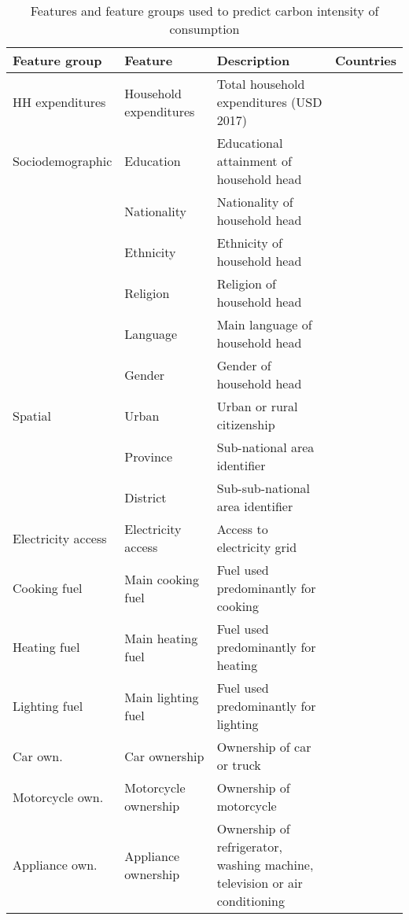 \begin{table}[ht!]
  \centering
\begin{adjustbox}{width=1\textwidth}
\begin{tabular}[]{l|l|l|r}
\toprule
\multicolumn{1}{l}{Feature group} & \multicolumn{1}{l}{Feature} & \multicolumn{1}{l}{Description} & \multicolumn{1}{l}{Countries} \\ \hline
     
        HH expenditures & Household expenditures & Total household expenditures (USD 2017) & \\ \hline
        Sociodemographic & Education & Educational attainment of household head & \\
         & Nationality & Nationality of household head & \\
         & Ethnicity & Ethnicity of household head & \\
         & Religion & Religion of household head & \\
         & Language & Main language of household head & \\
         & Gender & Gender of household head & \\ \hline
         Spatial & Urban & Urban or rural citizenship & \\
        & Province & Sub-national area identifier & \\
        & District & Sub-sub-national area identifier & \\ \hline
        Electricity access & Electricity access & Access to electricity grid & \\
        Cooking fuel & Main cooking fuel & Fuel used predominantly for cooking & \\
        Heating fuel & Main heating fuel & Fuel used predominantly for heating & \\
        Lighting fuel & Main lighting fuel & Fuel used predominantly for lighting & \\
        Car own. & Car ownership & Ownership of car or truck & \\
        Motorcycle own. & Motorcycle ownership & Ownership of motorcycle & \\
        Appliance own. & Appliance ownership & \makecell[tl]{Ownership of refrigerator, washing machine, \\ television or air conditioning} & \\
\end{tabular}

\end{adjustbox}
  \caption{Features and feature groups used to predict carbon intensity of consumption}
  \label{tab:features}


\end{table}
